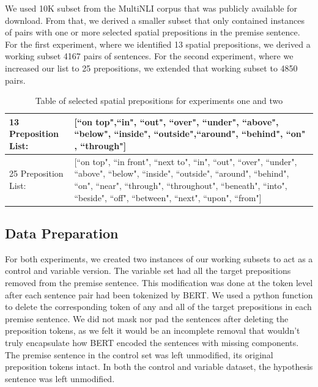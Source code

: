 \documentclass[12pt,letterpaper]{article}
\begin{document}
We used 10K subset from the MultiNLI corpus that was publicly available for download. From that, we derived a smaller subset that only contained instances of pairs with one or more selected spatial prepositions in the premise sentence. For the first experiment, where we identified 13 spatial prepositions, we derived a working subset 4167 pairs of sentences. For the second experiment, where we increased our list to 25 prepositions, we extended that working subset to 4850 pairs. 




\begin{table}[h]
\begin{flushleft}
	\begin{tabularx}{\textwidth}{l X}
    13 Preposition List: & [``on top",``in", ``out", ``over", ``under", ``above", ``below", ``inside", ``outside",``around", ``behind", ``on" , ``through"]\\
    \hline
    25 Preposition List: & [``on top", ``in front", ``next to", ``in", ``out", ``over", ``under", ``above", ``below", ``inside", ``outside", ``around", ``behind", ``on", ``near", ``through", ``throughout", ``beneath", ``into", ``beside", ``off", ``between", ``next", ``upon", ``from"]\\
	
	\hline
	\end{tabularx}
\caption{Table of selected spatial prepositions for experiments one and two} 
\label{t:preps}
\end{flushleft}
\end{table}

\subsection{Data Preparation}
For both experiments, we created two instances of our working subsets to act as a control and variable version. The variable set had all the target prepositions removed from the premise sentence. This modification was done at the token level after each sentence pair had been tokenized by BERT. We used a python function to delete the corresponding token of any and all of the target prepositions in each premise sentence. We did not mask nor pad the sentences after deleting the preposition tokens, as we felt it would be an incomplete removal that wouldn't truly encapsulate how BERT encoded the sentences with missing components. The premise sentence in the control set was left unmodified, its original preposition tokens intact. In both the control and variable dataset, the hypothesis sentence was left unmodified. 
\end{document}
